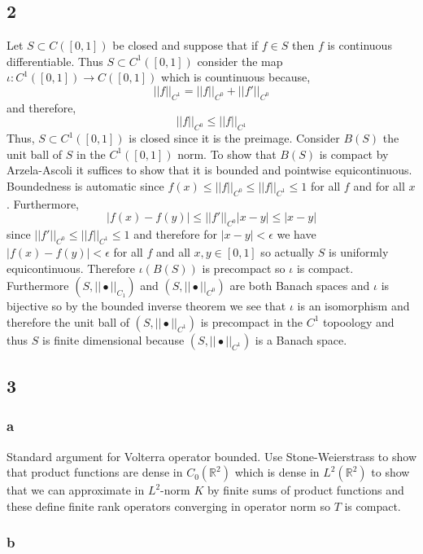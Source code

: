 \documentclass[12pt]{article}
\newcommand{\R}{\mathbb{R}}
\begin{document}
\subsection{2}

Let $S \subset C([0,1])$ be closed and suppose that if $f \in S$ then $f$ is continuous differentiable. Thus $S \subset C^1([0,1])$ consider the map $\iota : C^1([0,1]) \to C([0,1])$ which is countinuous because,
\[ || f ||_{C^1} = || f ||_{C^0} + || f' ||_{C^0} \]
and therefore,
\[ || f ||_{C^0} \le || f ||_{C^1} \]
Thus, $S \subset C^1([0,1])$ is closed since it is the preimage. Consider $B(S)$ the unit ball of $S$ in the $C^1([0,1])$ norm. To show that $B(S)$ is compact by Arzela-Ascoli it suffices to show that it is bounded and pointwise equicontinuous.  Boundedness is automatic since $f(x) \le || f ||_{C^0} \le || f ||_{C^1} \le 1$ for all $f$ and for all $x$. Furthermore, 
\[ | f(x) - f(y) | \le || f' ||_{C^0} | x - y | \le | x - y | \]
since $|| f' ||_{C^0} \le || f ||_{C^1} \le 1$ and therefore for $| x - y | < \epsilon$ we have $|f(x) - f(y)| < \epsilon$ for all $f$ and all $x, y \in [0,1]$ so actually $S$ is uniformly equicontinuous. Therefore $\iota(B(S))$ is precompact so $\iota$ is compact. Furthermore $(S, || \bullet ||_{C_1})$ and $(S, || \bullet ||_{C^0})$ are both Banach spaces and $\iota$ is bijective so by the bounded inverse theorem we see that $\iota$ is an isomorphism and therefore the unit ball of $(S, || \bullet ||_{C^1})$ is precompact in the $C^1$ topoology and thus $S$ is finite dimensional because $(S, || \bullet ||_{C^1})$ is a Banach space.

\subsection{3}

\subsubsection{a}

Standard argument for Volterra operator bounded. Use Stone-Weierstrass to show that product functions are dense in $C_0(\R^2)$ which is dense in $L^2(\R^2)$ to show that we can approximate in $L^2$-norm $K$ by finite sums of product functions and these define finite rank operators converging in operator norm so $T$ is compact.

\subsubsection{b}
\end{document}

